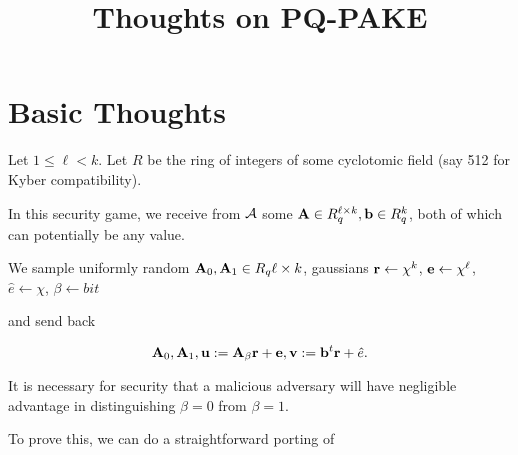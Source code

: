 \documentclass[oribibl,envcountsect,envcountsame]{llncs}
\title{Thoughts on PQ-PAKE}
\begin{document}
\section{Basic Thoughts}

Let $1 \leq \ell < k$. Let $R$ be the ring of integers of some cyclotomic field (say 512 for Kyber compatibility).

In this security game, we receive from $\mathcal{A}$
 some $\mathbf{A} \in R_q^{\ell \times k}, \mathbf{b} \in R_q^{k}$, both of which can potentially
be any value. 

We sample uniformly random $\mathbf{A}_0, \mathbf{A}_1 \in R_q{\ell \times k}$, 
gaussians $\mathbf{r} \gets \chi^{k}$, $\mathbf{e} \gets \chi^{\ell}$, $\hat{e} \gets \chi$,
$\beta \gets bit$

and send back 

$$\mathbf{A}_0, \mathbf{A}_1, \mathbf{u} := \mathbf{A}_{\beta}\mathbf{r} + \mathbf{e}, \mathbf{v} := \mathbf{b}^{t}\mathbf{r} + \hat{e}.$$

It is necessary for security that a malicious adversary will have negligible advantage in
distinguishing $\beta=0$ from $\beta=1$.

To prove this, we can do a straightforward porting of ~\cite{DBLP:conf/stoc/BrakerskiLPRS13}







\end{document}
